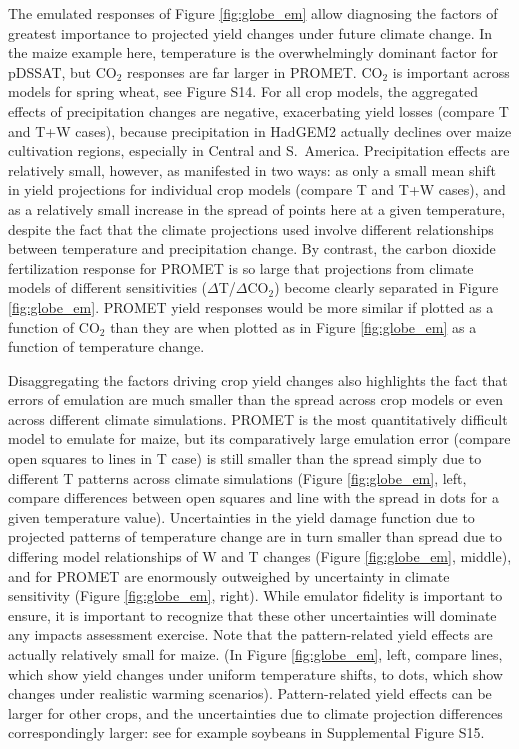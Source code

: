 \documentclass[gmdd]{copernicus} %
\begin{document}
The emulated responses of Figure \ref{fig:globe_em} allow diagnosing the factors of greatest importance to projected yield changes under future climate change. In the maize example here, temperature is the overwhelmingly dominant factor for pDSSAT, but CO$_2$ responses are far larger in PROMET. CO$_2$ is important across models for spring wheat, see Figure S14. For all crop models, the aggregated effects of precipitation changes are negative, exacerbating yield losses (compare T and T+W cases), because precipitation in HadGEM2 actually declines over maize cultivation regions, especially in Central and S.\ America. Precipitation effects are relatively small, however, as manifested in two ways: as only a small mean shift in yield projections for individual crop models (compare T and T+W cases), and as a relatively small increase in the spread of points here at a given temperature, despite the fact that the climate projections used involve different relationships between temperature and precipitation change.  By contrast, the carbon dioxide fertilization response for PROMET is so large that projections from climate models of different sensitivities ($\Delta$T/$\Delta$CO$_2$) become clearly separated in Figure \ref{fig:globe_em}. PROMET yield responses would be more similar if plotted as a function of CO$_2$ than they are when plotted as in Figure \ref{fig:globe_em} as a function of temperature change. 

Disaggregating the factors driving crop yield changes also highlights the fact that errors of emulation are much smaller than the spread across crop models or even across different climate simulations.
PROMET is the most quantitatively difficult model to emulate for maize, but its comparatively large emulation error (compare open squares to lines in T case) is still smaller than the spread simply due to different T patterns across climate simulations (Figure \ref{fig:globe_em}, left, compare differences between open squares and line with the spread in dots for a given temperature value). Uncertainties in the yield damage function due to projected patterns of temperature change are in turn smaller than spread due to differing model relationships of W and T changes (Figure \ref{fig:globe_em}, middle), and for PROMET are enormously outweighed by uncertainty in climate sensitivity (Figure \ref{fig:globe_em}, right).
While emulator fidelity is important to ensure, it is important to recognize that these other  uncertainties will dominate any impacts assessment exercise.
Note that the pattern-related yield effects are actually relatively small for maize. (In Figure \ref{fig:globe_em}, left, compare lines, which show yield changes under uniform temperature shifts, to dots,  which show changes under realistic warming scenarios). Pattern-related yield effects can be larger for other crops, and the uncertainties due to climate projection differences correspondingly larger: see for example soybeans in Supplemental Figure S15. 
\end{document}
